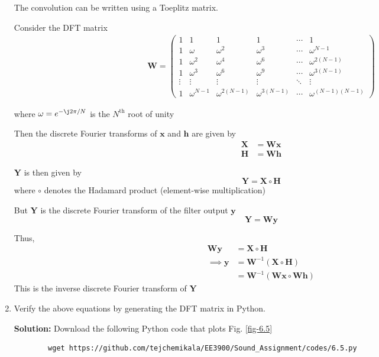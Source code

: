 \documentclass[journal,12pt,twocolumn]{IEEEtran}
\newcommand{\solution}{\noindent \textbf{Solution: }}
\providecommand{\brak}[1]{\ensuremath{\left(#1\right)}}
\let\vec\mathbf
\numberwithin{equation}{section}
\renewcommand\thesection{\arabic{section}}
\newcommand{\myvec}[1]{\ensuremath{\begin{pmatrix}#1\end{pmatrix}}}
\begin{document}
\begin{enumerate}[label=\thesection.\arabic*]
	The convolution can be written using a Toeplitz matrix. 
	
	Consider the DFT matrix
	\begin{align}
		\vec{W} = \myvec{
			1 & 1 & 1 & 1 & \cdots & 1 \\
			1 & \omega & \omega^2 & \omega^3 & \cdots & \omega^{N-1} \\
			1 & \omega^2 & \omega^4 & \omega^6 & \cdots & \omega^{2(N-1)} \\
			1 & \omega^3 & \omega^6 & \omega^9 & \cdots & \omega^{3(N-1)} \\
			\vdots & \vdots & \vdots & \vdots & \ddots & \vdots \\ 
			1 & \omega^{N-1} & \omega^{2(N-1)} & \omega^{3(N-1)} & \cdots & \omega^{(N-1)(N-1)}
		}
	\end{align}
	
	where $\omega = e^{-\j 2\pi/N}$ is the $N^{\mathrm{th}}$ root of unity
	
	Then the discrete Fourier transforms of $\vec{x}$ and $\vec{h}$ are given by
	\begin{align}
		\vec{X} &= \vec{W} \vec{x} \\
		\vec{H} &= \vec{W} \vec{h}
	\end{align}
	
	$\vec{Y}$ is then given by
	\begin{equation}
		\vec{Y} = \vec{X} \circ \vec{H}
	\end{equation}
	where $\circ$ denotes the Hadamard product (element-wise multiplication)
	
	But $\vec{Y}$ is the discrete Fourier transform of the filter output $\vec{y}$
	\begin{equation}
		\vec{Y} = \vec{W} \vec{y}
	\end{equation}
	
	Thus,
	\begin{align}
		\vec{W} \vec{y} &= \vec{X} \circ \vec{H} \\
		\implies \vec{y} &= \vec{W}^{-1} \brak{\vec{X} \circ \vec{H}} \\
		&= \vec{W}^{-1} \brak{\vec{W} \vec{x} \circ \vec{W} \vec{h}}
	\end{align}
	This is the inverse discrete Fourier transform of $\vec{Y}$
	
	\item Verify the above equations by generating the DFT matrix in Python.
	
	\solution Download the following Python code that plots Fig. \ref{fig-6.5}
	\begin{lstlisting}
		wget https://github.com/tejchemikala/EE3900/Sound_Assignment/codes/6.5.py
	\end{lstlisting}
	

\end{enumerate}
\end{document}
